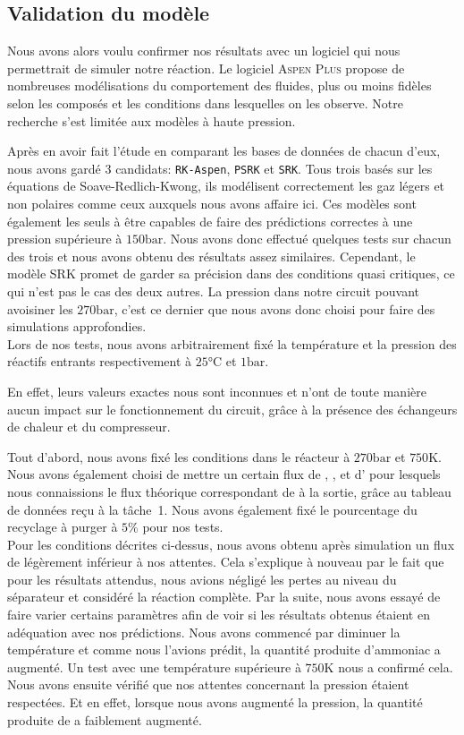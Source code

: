 \subsection{Validation du modèle}

Nous avons alors voulu confirmer nos résultats avec un logiciel 
qui nous permettrait de simuler notre réaction. 
Le logiciel \textsc{Aspen Plus} propose de nombreuses 
modélisations du comportement des fluides, 
plus ou moins fidèles selon les composés et 
les conditions dans lesquelles on les observe. 
Notre recherche s'est limitée aux modèles à haute pression. 

Après en avoir fait l'étude en comparant les bases de données de chacun d'eux, 
nous avons gardé 3 candidats: \texttt{RK-Aspen}, \texttt{PSRK} et \texttt{SRK}. 
Tous trois basés sur les équations de Soave-Redlich-Kwong, 
ils modélisent correctement les gaz légers et non polaires 
comme ceux auxquels nous avons affaire ici. 
Ces modèles sont également les seuls à être capables de faire 
des prédictions correctes à une pression supérieure à $150\si{\bar}$. 
Nous avons donc effectué quelques tests sur chacun des trois 
et nous avons obtenu des résultats assez similaires.
Cependant, le modèle SRK promet de garder sa précision dans des conditions 
quasi critiques, ce qui n'est pas le cas des deux autres. 
La pression dans notre circuit pouvant avoisiner les $270\si{\bar}$, 
c'est ce dernier que nous avons donc choisi pour faire des simulations approfondies.\\
Lors de nos tests, nous avons arbitrairement fixé la température et 
la pression des réactifs entrants respectivement à $25\si{\degreeCelsius}$ et $1\si{\bar}$.

En effet, leurs valeurs exactes nous sont inconnues et n'ont de toute manière 
aucun impact sur le fonctionnement du circuit, grâce à la présence des échangeurs de chaleur 
et du compresseur.

Tout d'abord, nous avons fixé les conditions dans le réacteur à $270\si{\bar}$ 
et $750\si{\kelvin}$. 
Nous avons également choisi de mettre un certain flux de , , et d'  
pour lesquels nous connaissions le flux théorique correspondant de  à la sortie,
grâce au tableau de données reçu à la tâche~1. 
Nous avons également fixé le pourcentage du recyclage à purger à $5\%$ pour nos tests.\\

Pour les conditions décrites ci-dessus, 
nous avons obtenu après simulation un flux de  légèrement inférieur à nos attentes. 
Cela s'explique à nouveau par le fait que pour les résultats attendus, 
nous avions négligé les pertes au niveau du séparateur et considéré la réaction complète.
Par la suite, nous avons essayé de faire varier certains paramètres afin 
de voir si les résultats obtenus étaient en adéquation avec nos prédictions. 
Nous avons commencé par diminuer la température et comme nous l'avions prédit, 
la quantité produite d'ammoniac a augmenté. 
Un test avec une température supérieure à $750\si{\kelvin}$ nous a confirmé cela. 
Nous avons ensuite vérifié que nos attentes concernant la pression étaient respectées. 
Et en effet, lorsque nous avons augmenté la pression, 
la quantité produite de  a faiblement augmenté.

